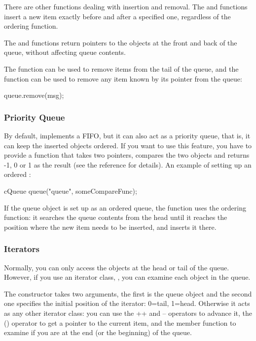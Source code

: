 There are other functions dealing with insertion and removal.  The
 and  functions insert a
new item exactly before and after a specified one, regardless of the
ordering function.

The  and  functions return pointers to the objects
at the front and back of the queue, without affecting queue contents.

The  function can be used to remove items from the
tail of the queue, and the  function can be
used to remove any item known by its pointer from the queue:

\begin{cpp}
queue.remove(msg);
\end{cpp}



\subsubsection{Priority Queue}


By default,  implements a FIFO, but it can also act as
a priority queue, that is, it can keep the inserted objects
ordered.  If you want to use this feature, you have
to provide a function that takes two  pointers,
compares the two objects and returns -1, 0 or 1 as the result (see the
reference for details).  An example of setting up an ordered
:

\begin{cpp}
cQueue queue("queue", someCompareFunc);
\end{cpp}

If the queue object is set up as an ordered queue, the 
function uses the ordering function: it searches the queue contents
from the head until it reaches the position where the new item
needs to be inserted, and inserts it there.


\subsubsection{Iterators}


Normally, you can only access the objects at the head or tail of the
queue. However, if you use an iterator class, ,
you can examine each object in the queue.

The  constructor takes two arguments, the first
is the queue object and the second one specifies the initial position
of the iterator: 0=tail, 1=head. Otherwise it acts as any other
{\opp} iterator class: you can use the ++ and -- operators to advance
it, the () operator to get a pointer to the current item, and the
 member function to examine if you are at the end (or the
beginning) of the queue.


